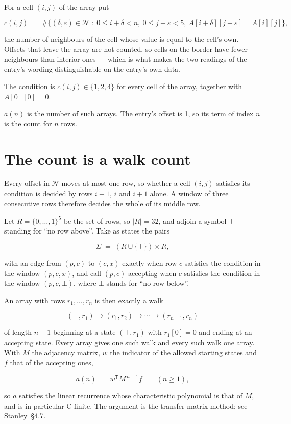 \documentclass[11pt]{article}
\theoremstyle{definition}
\begin{document}
For a cell $(i,j)$ of the array put

\[c(i,j) \;=\; \#\bigl\{(\delta,\varepsilon)\in\mathcal{N} \;:\; 0\le i+\delta<n,\ 0\le j+\varepsilon<5,\ A[i+\delta][j+\varepsilon] = A[i][j]\bigr\},\]

the number of neighbours of the cell whose value is equal to the cell's own. Offsets that leave the array are not counted, so cells on the border have fewer neighbours than interior ones --- which is what makes the two readings of the entry's wording distinguishable on the entry's own data.

The condition is $c(i,j) \in \{1, 2, 4\}$ for every cell of the array, together with $A[0][0]=0$.

$a(n)$ is the number of such arrays. The entry's offset is 1, so its term of index $n$ is the count for $n$ rows.

\section{The count is a walk count}

Every offset in $\mathcal{N}$ moves at most one row, so whether a cell $(i,j)$ satisfies its condition is decided by rows $i-1$, $i$ and $i+1$ alone. A window of three consecutive rows therefore decides the whole of its middle row.

Let $R = \{0,\dots,1\}^{5}$ be the set of rows, so $|R| = 32$, and adjoin a symbol $\top$ standing for ``no row above''. Take as states the pairs

\[\Sigma \;=\; (R \cup \{\top\}) \times R,\]

with an edge from $(p,c)$ to $(c,x)$ exactly when row $c$ satisfies the condition in the window $(p,c,x)$, and call $(p,c)$ accepting when $c$ satisfies the condition in the window $(p,c,\bot)$, where $\bot$ stands for ``no row below''.

An array with rows $r_1,\dots,r_n$ is then exactly a walk

\[(\top,r_1) \to (r_1,r_2) \to \cdots \to (r_{n-1},r_n)\]

of length $n-1$ beginning at a state $(\top,r_1)$ with $r_1[0]=0$ and ending at an accepting state. Every array gives one such walk and every such walk one array. With $M$ the adjacency matrix, $w$ the indicator of the allowed starting states and $f$ that of the accepting ones,

\[a(n) \;=\; w^{\mathsf T} M^{\,n-1} f \qquad (n \ge 1),\]

so $a$ satisfies the linear recurrence whose characteristic polynomial is that of $M$, and is in particular C-finite. The argument is the transfer-matrix method; see Stanley~\S4.7.
\end{document}
